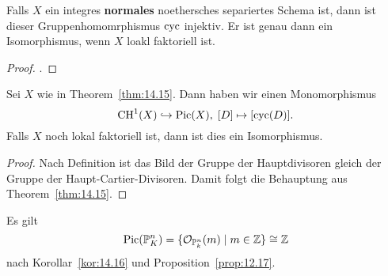 \begin{thm}
\label{thm:14.15}
	Falls $X$ ein integres \textbf{normales} noethersches separiertes Schema ist, dann ist dieser Gruppenhomomrphismus $\operatorname{cyc}$ injektiv. Er ist genau dann ein Isomorphismus, wenn $X$ loakl faktoriell ist.
	\begin{proof}
		\cite[Théorème~21.6.9]{grothendieck1967elements}.
	\end{proof}
\end{thm}

\begin{kor}
\label{kor:14.16}
	Sei $X$ wie in Theorem~\ref{thm:14.15}. Dann haben wir einen Monomorphismus
	\[
		\operatorname{CH}^1(X) \hookrightarrow \operatorname{Pic}(X),\; [D] \mapsto [\operatorname{cyc}(D)]. 
	\]
	Falls $X$ noch lokal faktoriell ist, dann ist dies ein Isomorphismus.
	\begin{proof}
		Nach Definition ist das Bild der Gruppe der Hauptdivisoren gleich der Gruppe der Haupt-Cartier-Divisoren. Damit folgt die Behauptung aus Theorem~\ref{thm:14.15}.
	\end{proof}
\end{kor}

\begin{bsp}
\label{bsp:14.17}
	Es gilt
	\[
		\operatorname{Pic}(\mathbb {P}^n_K) = \{\mathcal{O}_{\mathbb {P}^n_k}(m)\mid m \in \mathbb {Z}\} \cong \mathbb {Z}
	\]
	nach Korollar~\ref{kor:14.16} und Proposition~\ref{prop:12.17}.
\end{bsp}

